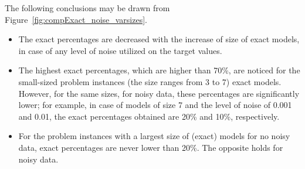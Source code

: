 \documentclass[a4paper,12pt]{elsarticle}
\begin{document}
The  following conclusions may be drawn from Figure~\ref{fig:compExact_noise_varsizes}.
\begin{itemize}
	\item The exact percentages are decreased with the increase of size of exact models, in case of any level of noise utilized on the target values.  %
	\item The highest exact percentages, which are higher than 70\%, are noticed for the small-sized problem instances  (the size ranges from 3 to 7) exact models. However, for the same sizes, for noisy data, these percentages are significantly lower; for example, in case of models of size 7 and the level of noise of 0.001 and 0.01, the exact percentages obtained are 20\% and 10\%, respectively. 
	
	\item   For the problem instances with a largest size of (exact) models for no noisy data, exact percentages are never lower than 20\%. The opposite holds for noisy data. 
\end{itemize}
\end{document}
